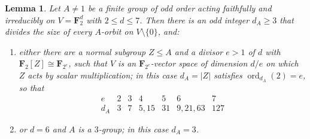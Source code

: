 \documentclass[11pt]{article}
\newtheorem{lemma}[theorem]{Lemma}
\theoremstyle{definition}
\theoremstyle{remark}
\newcommand{\F}{\mathbf F}
\begin{document}
\begin{lemma}\label{lem:scalar}
Let $A\neq1$ be a finite group of odd order acting faithfully and
irreducibly on $V=\F_2^d$ with $2\le d\le7$.  Then there is an odd
integer $d_A\ge3$ that divides the size of every $A$-orbit on
$V\setminus\{0\}$, and:
\begin{enumerate}[label=\textup{(\roman*)}]
\item either there are a normal subgroup $Z\le A$ and a divisor $e>1$
 of $d$ with $\F_2[Z]\cong\F_{2^e}$, such that $V$ is an
 $\F_{2^e}$-vector space of dimension $d/e$ on which $Z$ acts by scalar
 multiplication; in this case $d_A=|Z|$ satisfies
 $\operatorname{ord}_{d_A}(2)=e$, so that
\[
 \begin{array}{c|cccccc}
 e&2&3&4&5&6&7\\\hline
 d_A&3&7&5,15&31&9,21,63&127
 \end{array}
\]
\item or $d=6$ and $A$ is a $3$-group; in this case $d_A=3$.
\end{enumerate}
\end{lemma}
\end{document}
